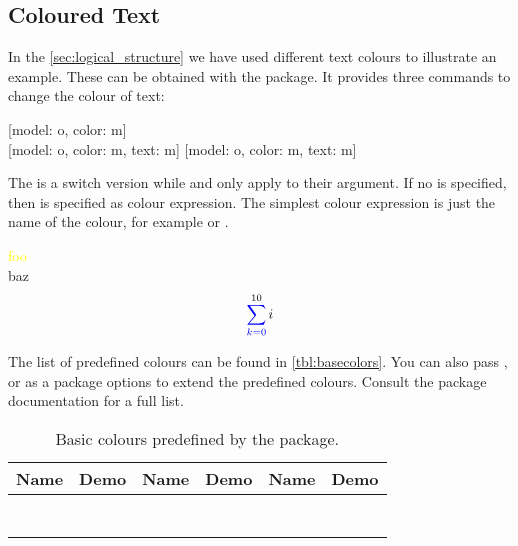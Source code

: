 \subsection{Coloured Text}
In the \autoref{sec:logical_structure} we have used different text colours to
illustrate an example. These can be obtained with the  package. It
provides three commands to change the colour of text:
\begin{lscommand}
  [model: o, color: m] \\
  [model: o, color: m, text: m]
  [model: o, color: m, text: m]
\end{lscommand}
The  is a switch version while  and 
only apply to their argument. If no  is specified, then
 is specified as colour expression. The simplest colour expression
is just the name of the colour, for example  or .
\begin{example}
\textcolor{yellow}{foo} \\
\color{red} baz
\[
  \mathcolor{blue}{
    \sum_{k=0}
  }^{10} i
\]
\end{example}
The list of predefined colours can be found in \autoref{tbl:basecolors}. You can
also pass ,  or  as a package
options to extend the predefined colours. Consult the package documentation for
a full list.
\begin{table}
  \ExplSyntaxOn
  \ExplSyntaxOff
  \caption{Basic colours predefined by the 
    package.}\label{tbl:basecolors}
  \begin{tabular}{@{}lc*2{@{\qquad}lc}@{}}
    \toprule
    Name                 & Demo                  &
    Name                 & Demo                  &
    Name                 & Demo                                       \\
    \midrule
        &  &  \\
         &       &     \\
        &    &    \\
         &      &  \\
     &     &   \\
         &       &  \\
        &                       &                    \\
    \bottomrule
  \end{tabular}
\end{table}

